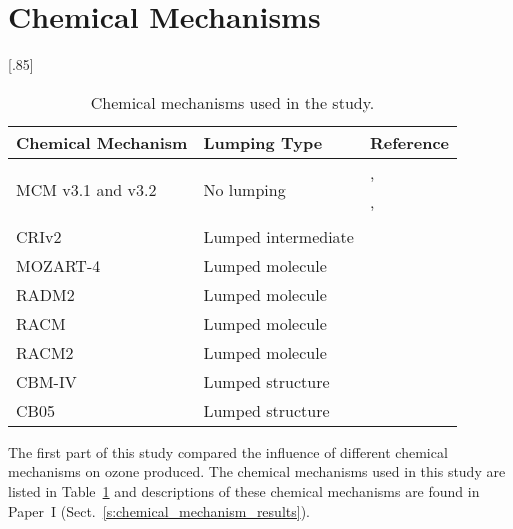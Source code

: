 \section{Chemical Mechanisms} \label{s:chemical_mechanisms}
\begin{table}[t]%
    \begin{center}%
        \caption{Chemical mechanisms used in the study.}%
        \scalebox{.85}[.85]{\begin{tabular}{lll}%
                \hline \hline
                \textbf{Chemical Mechanism} & \textbf{Lumping Type} & \textbf{Reference} \\
                \hline \hline
                \multirow{3}{*}{MCM v3.1 and v3.2} & \multirow{3}{*}{No lumping} & \citet{Jenkin:1997}, \citet{Jenkin:2003} \\
                & & \citet{Saunders:2003}, \citet{Bloss:2005} \\
                & & \citet{MCM_Site} \\
                CRIv2 & Lumped intermediate & \citet{Jenkin:2008} \\
                MOZART-4 & Lumped molecule & \citet{Emmons:2010} \\
                RADM2 & Lumped molecule & \citet{Stockwell:1990} \\
                RACM & Lumped molecule & \citet{Stockwell:1997} \\
                RACM2 & Lumped molecule & \citet{Goliff:2013} \\
                CBM-IV & Lumped structure & \citet{Gery:1989} \\
                CB05 & Lumped structure & \citet{Yarwood:2005} \\
                \hline \hline
            \end{tabular}%
        }%
        \label{t:mechanisms}%
    \end{center}%
    \vspace{-13mm}
\end{table}%
The first part of this study compared the influence of different chemical mechanisms on ozone produced.
The chemical mechanisms used in this study are listed in Table~\ref{t:mechanisms} and descriptions of these chemical mechanisms are found in Paper~I (Sect.~\ref{s:chemical_mechanism_results}).

